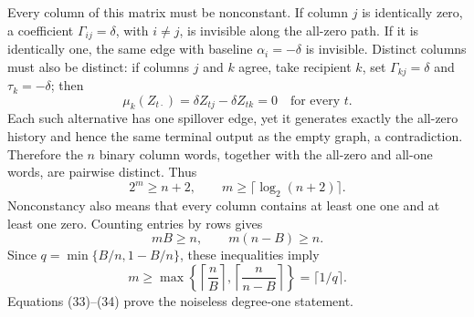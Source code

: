 Every column of this matrix must be nonconstant.  If column \(j\) is identically zero, a coefficient \(\Gamma_{ij}=\delta\), with \(i\ne j\), is invisible along the all-zero path.  If it is identically one, the same edge with baseline \(\alpha_i=-\delta\) is invisible.  Distinct columns must also be distinct: if columns \(j\) and \(k\) agree, take recipient \(k\), set \(\Gamma_{k j}=\delta\) and \(\tau_k=-\delta\); then
\[
 \mu_k(Z_{t\cdot})=\delta Z_{tj}-\delta Z_{tk}=0
 \quad\text{for every }t.
\]
Each such alternative has one spillover edge, yet it generates exactly the all-zero history and hence the same terminal output as the empty graph, a contradiction.  Therefore the \(n\) binary column words, together with the all-zero and all-one words, are pairwise distinct.  Thus
\[
 2^m\ge n+2,
 \qquad
 m\ge\lceil\log_2(n+2)\rceil.                                       \tag{33}
\]
Nonconstancy also means that every column contains at least one one and at least one zero.  Counting entries by rows gives
\[
 mB\ge n,
 \qquad
 m(n-B)\ge n.
\]
Since \(q=\min\{B/n,1-B/n\}\), these inequalities imply
\[
 m\ge\max\left\{\left\lceil\frac nB\right\rceil,
                    \left\lceil\frac n{n-B}\right\rceil\right\}
 =\lceil1/q\rceil.                                                     \tag{34}
\]
Equations (33)--(34) prove the noiseless degree-one statement.